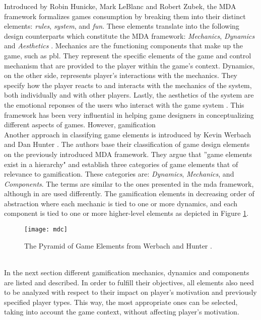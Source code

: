 Introduced by Robin Hunicke, Mark LeBlanc and Robert Zubek, the MDA framework formalizes games consumption by breaking them into their distinct elements: \textit{rules}, \textit{system}, and \textit{fun}. These elements translate into the following design counterparts which constitute the MDA framework: \textit{Mechanics}, \textit{Dynamics} and \textit{Aesthetics} \cite{hunicke2004mda}. Mechanics are the functioning components that make up the game, such as \acrshort{pbl}. They represent the specific elements of the game and control mechanism that are provided to the player within the game's context. Dynamics, on the other side, represents player's interactions with the mechanics. They specify how the player reacts to and interacts with the mechanics of the system, both individually and with other players. Lastly, the aesthetics of the system are the emotional reponses of the users who interact with the game system \cite{zichermann2011gamification}. This framework has been very influential in helping game designers in conceptualizing different aspects of games. However, gamification \\ Another approach in classifying game elements is introduced by Kevin Werbach and Dan Hunter \cite{werbach2012win}. The authors base their classification of game design elements on the previously introduced MDA framework. They argue that ''game elements exist in a hierarchy" and establish three categories of game elements that of relevance to gamification. These categories are: \textit{Dynamics}, \textit{Mechanics}, and \textit{Components}. The terms are similar to the ones presented in the \acrshort{mda} framework, although in \cite{werbach2012win} are used differently. The gamification elements in decreasing order of abstraction where each mechanic is tied to one or more dynamics, and each component is tied to one or more higher-level elements as depicted in Figure \ref{fig:mdc}.\\
\begin{figure}[h]
    \centering
    \texttt{[image: mdc]}
    \caption{The Pyramid of Game Elements from Werbach and Hunter \cite{werbach2012win}.}
    \label{fig:mdc}
\end{figure}\\
In the next section different gamification mechanics, dynamics and components are listed and described. In order to fulfill their objectives, all elements also need to be analyzed with respect to their impact on player's motivation and previously specified player types. This way, the most appropriate ones can be selected, taking into account the game context, without affecting player's motivation.
